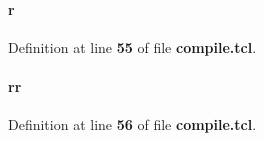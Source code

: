 \paragraph[{r}]{\setlength{\rightskip}{0pt plus 5cm}r}\label{rx__path__top_2data2packets_2compile_8tcl_a514f1b439f404f86f77090fa9edc96ce}


Definition at line {\bf 55} of file {\bf compile.\+tcl}.

\paragraph[{rr}]{\setlength{\rightskip}{0pt plus 5cm}rr}\label{rx__path__top_2data2packets_2compile_8tcl_aeb9279982226a42afdf2860dbdc29b45}


Definition at line {\bf 56} of file {\bf compile.\+tcl}.

